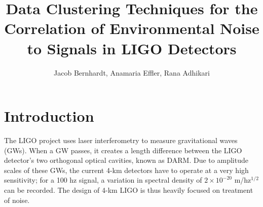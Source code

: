 \documentclass[colorlinks=true,pdfstartview=FitV,linkcolor=blue,
            citecolor=red,urlcolor=magenta]{ligodoc}
\title{Data Clustering Techniques for the Correlation of Environmental Noise to Signals in LIGO Detectors}
\author{Jacob Bernhardt, Anamaria Effler, Rana Adhikari}
\begin{document}

\section{Introduction}
The LIGO project uses laser interferometry to measure gravitational waves (GWs).
When a GW passes, it creates a length difference between the LIGO detector's two orthogonal optical cavities, known as DARM.
Due to amplitude scales of these GWs, the current 4-km detectors have to operate at a very high sensitivity; for a 100 hz signal, a variation in spectral density of $2\times 10^{-20}$ m/hz$^{1/2}$ can be recorded.
The design of 4-km LIGO is thus heavily focused on treatment of noise.
\end{document}
